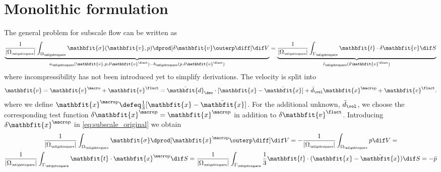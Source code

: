 \documentclass[a4paper,11pt]{article}
\renewcommand{\ta}[1]{\mathbfit{#1}}
\renewcommand{\ts}[1]{\mathbfit{#1}}
\renewcommand{\Box}{{\scalebox{0.5}{\mdlgwhtsquare}}}
\newcommand{\pressure}{\mathrm{p}}
\begin{document}
\section{Monolithic formulation} \label{sec:monolithic}
The general problem for subscale flow can be written as
\begin{align}
 \underbrace{\frac{1}{|\Omega_\Box|} \int_{\Omega_\Box} \ts\sigma(\ta v, p)\dprod [\delta\ta v\outerp\diff] \dif V}_{a_\Box(\ta v,p;\delta\ta v^\fluct)-b_\Box(p,\delta\ta v^\fluct)}
	= \underbrace{\frac{1}{|\Omega_\Box|} \int_{\Gamma_\Box} \ta t\cdot \delta\ta v\dif S}_{l_\Box(\delta\ta v^\fluct)}
 \label{eq:subscale_original}
\end{align}
where incompressibility has not been introduced yet to simplify derivations.
The velocity is split into
\begin{align}
 \ta v = \ta v^\macro + \ta v^\fluct = \bar{\ts d}_\dev \cdot [\ta x - \bar{\ta x}] + \bar{d}_\vol \ta x^{\macro\pressure} + \ta v^\fluct.
\end{align}
where we define $\ta x^{\macro\pressure} \defeq \frac13[\ta x - \bar{\ta x}]$.
For the additional unknown, $\bar{d}_\vol$, we choose the corresponding test function $\delta\ta x^{\macro\pressure} = \ta x^{\macro\pressure}$ in addition to $\delta \ta v^\fluct$.
Introducing $\delta\ta x^{\macro\pressure}$ in \eqref{eq:subscale_original} we obtain
\begin{multline}
  \frac{1}{|\Omega_\Box|}
	\int_{\Omega_\Box} \ts\sigma\dprod [\ta x^{\macro\pressure}\outerp\diff] \dif V
 =
-\frac{1}{|\Omega_\Box|}
	\int_{\Omega_\Box} p \dif V
 = \\
  \frac{1}{|\Omega_\Box|}
 \int_{\Gamma_\Box} \ta t\cdot \ta x^{\macro\pressure} \dif S = \frac{1}{|\Omega_\Box|} \int_{\Gamma_\Box}\frac13 \ta t\cdot(\ta x-\bar{\ta x}) \dif S = -\bar{p}
\end{multline}
\end{document}

